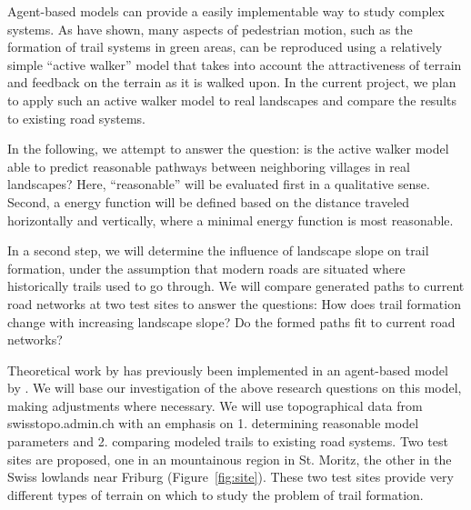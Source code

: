 \documentclass[a4paper, DIV11, abstracton]{scrartcl}
\begin{document}

Agent-based models can provide a easily implementable way to study complex systems. As \citet{helbing:1997} have shown, many aspects of pedestrian motion, such as the formation of trail systems in green areas, can be reproduced using a relatively simple ``active walker'' model that takes into account the attractiveness of terrain and feedback on the terrain as it is walked upon. In the current project, we plan to apply such an active walker model to real landscapes and compare the results to existing road systems.




In the following, we attempt to answer the question: is the active walker model able to predict reasonable pathways between neighboring villages in real landscapes? Here, ``reasonable'' will be evaluated first in a qualitative sense. Second, a energy function will be defined based on the distance traveled horizontally and vertically, where a minimal energy function is most reasonable.

In a second step, we will determine the influence of landscape slope on trail formation, under the assumption that modern roads are situated where historically trails used to go through. We will compare generated paths to current road networks at two test sites to answer the questions: How does trail formation change with increasing landscape slope? Do the formed paths fit to current road networks?

Theoretical work by \citet{helbing:1997} has previously been implemented in an agent-based model by \citet{trailsystems}. We will base our investigation of the above research questions on this model, making adjustments where necessary. We will use topographical data from swisstopo.admin.ch with an emphasis on 1. determining reasonable model parameters and 2. comparing modeled trails to existing road systems. Two test sites are proposed, one in an mountainous region in St. Moritz, the other in the Swiss lowlands near Friburg (Figure~\ref{fig:site}). These two test sites provide very different types of terrain on which to study the problem of trail formation.
\end{document}
